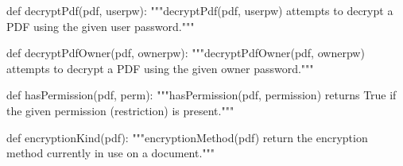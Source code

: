 def decryptPdf(pdf, userpw):
    """decryptPdf(pdf, userpw) attempts to decrypt a PDF using the given user
    password."""

def decryptPdfOwner(pdf, ownerpw):
    """decryptPdfOwner(pdf, ownerpw) attempts to decrypt a PDF using the given
    owner password."""

def hasPermission(pdf, perm):
    """hasPermission(pdf, permission) returns True if the given permission
    (restriction) is present."""

def encryptionKind(pdf):
    """encryptionMethod(pdf) return the encryption method currently in use on
    a document."""
